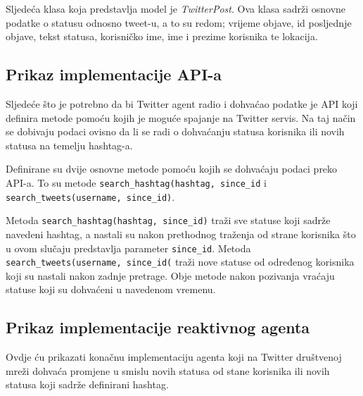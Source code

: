 \documentclass[a4paper,12pt]{foi}
\begin{document}
Sljedeća klasa koja predstavlja model je \textit{TwitterPost}. Ova klasa sadrži osnovne podatke o statusu odnosno tweet-u, a to su redom; vrijeme objave, id posljednje objave, tekst statusa, korisničko ime, ime i prezime korisnika te lokacija.

\lstset{commentstyle=\textit,language=python}


\subsection{Prikaz implementacije API-a}

Sljedeće što je potrebno da bi Twitter agent radio i dohvaćao podatke je API koji definira metode pomoću kojih je moguće spajanje na Twitter servis. Na taj način se dobivaju podaci ovisno da li se radi o dohvaćanju statusa korisnika ili novih statusa na temelju hashtag-a.

\lstset{commentstyle=\textit,language=python}


Definirane su dvije osnovne metode pomoću kojih se dohvaćaju podaci preko API-a. To su metode \texttt{search\_hashtag(hashtag, since\_id} i \texttt{search\_tweets(username, since\_id)}.

Metoda \texttt{search\_hashtag(hashtag, since\_id)} traži sve statuse koji sadrže navedeni hashtag, a nastali su nakon prethodnog traženja od strane korisnika što u ovom slučaju predstavlja parameter \texttt{since\_id}. Metoda \texttt{search\_tweets(username, since\_id(} traži nove statuse od određenog korisnika koji su nastali nakon zadnje pretrage. Obje metode nakon pozivanja vraćaju statuse koji su dohvaćeni u navedenom vremenu.

\subsection{Prikaz implementacije reaktivnog agenta}

Ovdje ću prikazati konačnu implementaciju agenta koji na Twitter društvenoj mreži dohvaća promjene u smislu novih statusa od stane korisnika ili novih statusa koji sadrže definirani hashtag.

\lstset{commentstyle=\textit,language=python}

\end{document}

